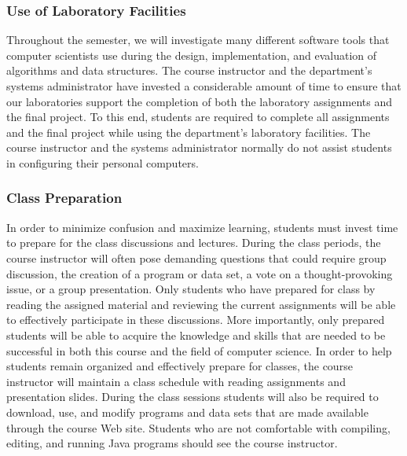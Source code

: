 \subsubsection*{Use of Laboratory Facilities}

Throughout the semester, we will investigate many different software tools that computer scientists use during the
design, implementation, and evaluation of algorithms and data structures.  The course instructor and the department's
systems administrator have invested a considerable amount of time to ensure that our laboratories support the completion
of both the laboratory assignments and the final project.  To this end, students are required to complete all
assignments and the final project while using the department's laboratory facilities. The course instructor and the
systems administrator normally do not assist students in configuring their personal computers.

\subsubsection*{Class Preparation}

%

In order to minimize confusion and maximize learning, students must invest time to prepare for the class discussions and
lectures.  During the class periods, the course instructor will often pose demanding questions that could require group
discussion, the creation of a program or data set, a vote on a thought-provoking issue, or a group presentation.  Only
students who have prepared for class by reading the assigned material and reviewing the current assignments will be able
to effectively participate in these discussions.  More importantly, only prepared students will be able to acquire the
knowledge and skills that are needed to be successful in both this course and the field of computer science.  In order
to help students remain organized and effectively prepare for classes, the course instructor will maintain a class
schedule with reading assignments and presentation slides.   During the class sessions students will also be required to
download, use, and modify programs and data sets that are made available through the course Web site.  Students who are
not comfortable with compiling, editing, and running Java programs should see the course instructor.


